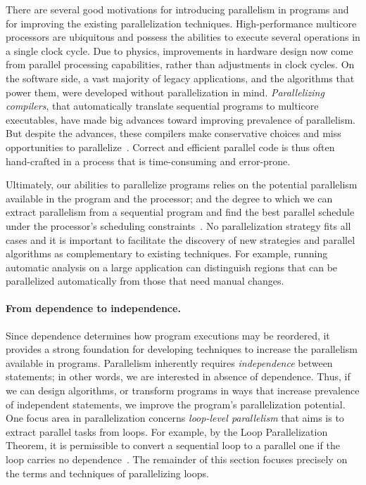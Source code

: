 There are several good motivations for introducing parallelism in programs and for improving the existing parallelization techniques.
High-performance multicore processors are ubiquitous and possess the abilities to execute several operations in a single clock cycle.
Due to physics, improvements in hardware design now come from parallel processing capabilities, rather than adjustments in clock cycles.
On the software side, a vast majority of legacy applications, and the algorithms that power them, were developed without parallelization in mind.
\emph{Parallelizing compilers}, that automatically translate sequential programs to multicore executables, have made big advances toward improving prevalence of parallelism.
But despite the advances, these compilers make conservative choices and miss opportunities to parallelize~\cite{holewinski2012}.
Correct and efficient parallel code is thus often hand-crafted in a process that is time-consuming and error-prone.

Ultimately, our abilities to parallelize programs relies on the potential parallelism available in the program and the processor;
and the degree to which we can extract parallelism from a sequential program and find the best parallel schedule under the processor's scheduling constraints~\cite{alfred2007}.
No parallelization strategy fits all cases and it is important to facilitate the discovery of new strategies and parallel algorithms as complementary to existing techniques.
For example, running automatic analysis on a large application can distinguish regions that can be parallelized automatically from those that need manual changes.

\paragraph*{From dependence to independence.}
Since dependence determines how program executions may be reordered, it provides a strong foundation for developing techniques to increase the parallelism available in programs.
Parallelism inherently requires \emph{independence} between statements;
in other words, we are interested in absence of dependence.
Thus, if we can design algorithms, or transform programs in ways that increase prevalence of independent statements, we improve the program's parallelization potential.
One focus area in parallelization concerns \emph{loop-level parallelism} that aims is to extract parallel tasks from loops.
For example, by the Loop Parallelization Theorem, it is permissible to convert a sequential loop to a parallel one if the loop carries no dependence~\cite[p. 82]{kennedy2001}.
The remainder of this section focuses precisely on the terms and techniques of parallelizing loops.

